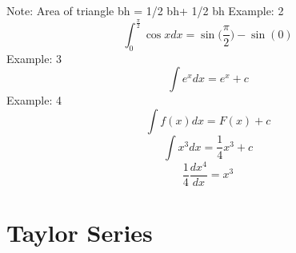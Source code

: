 Note: Area of triangle bh = 1/2 bh+ 1/2 bh
\newline
Example: 2
\begin{equation}
\int_{0}^{\frac{\pi}{2}}\cos xdx = \sin\big(\frac{\pi}{2}\big) - \sin(0)
\end{equation}
Example: 3
\begin{equation}
\int e^x dx = e^x+c
\end{equation}
Example: 4
\begin{equation}
\int f(x)dx=F(x)+c
\end{equation}
\begin{equation}
\int x^3 dx = \frac{1}{4}x^3+c	
\end{equation}
\begin{displaymath}
\frac{1}{4}\frac{dx^4}{dx} = x^3
\end{displaymath}

\section{Taylor Series}

